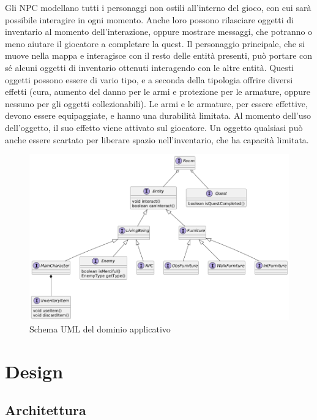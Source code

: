 \documentclass[a4paper,12pt]{report}
\begin{document}
%
\newline Gli NPC modellano tutti i personaggi non ostili all’interno del gioco, con cui sarà possibile interagire in ogni momento. Anche loro possono rilasciare oggetti di inventario al momento dell’interazione, oppure mostrare messaggi, che potranno o meno aiutare il giocatore a completare la quest.
%
\newline Il personaggio principale, che si muove nella mappa e interagisce con il resto delle entità presenti, può portare con sé alcuni oggetti di inventario ottenuti interagendo con le altre entità. Questi oggetti possono essere di vario tipo, e a seconda della tipologia offrire diversi effetti (cura, aumento del danno per le armi e protezione per le armature, oppure nessuno per gli oggetti collezionabili). Le armi e le armature, per essere effettive, devono essere equipaggiate, e hanno una durabilità limitata. Al momento dell’uso dell’oggetto, il suo effetto viene attivato sul giocatore. Un oggetto qualsiasi può anche essere scartato per liberare spazio nell’inventario, che ha capacità limitata.


\begin{figure}[H]
	\centering{}
	\includegraphics[width=\textwidth]{img/model.png}
	\caption{Schema UML del dominio applicativo}
	\label{img:model}
\end{figure}


\chapter{Design}

\section{Architettura}
\end{document}
